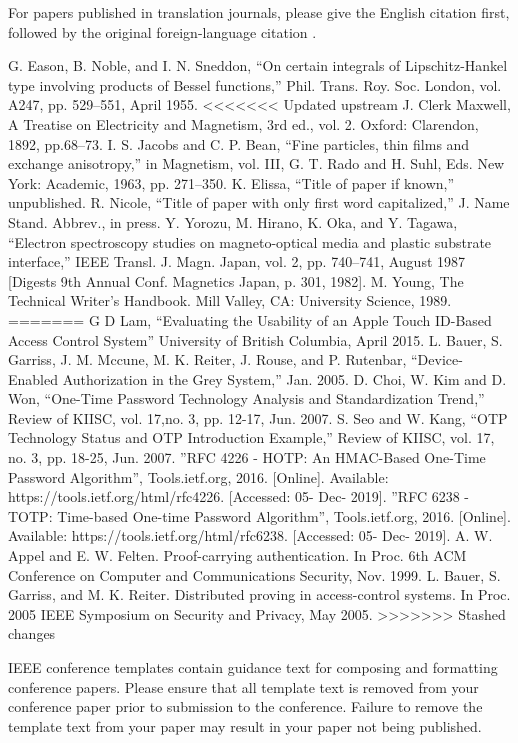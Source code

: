 \documentclass[conference]{IEEEtran}
\begin{document}
For papers published in translation journals, please give the English 
citation first, followed by the original foreign-language citation \cite{b6}.

\begin{thebibliography}{00}
 G. Eason, B. Noble, and I. N. Sneddon, ``On certain integrals of Lipschitz-Hankel type involving products of Bessel functions,'' Phil. Trans. Roy. Soc. London, vol. A247, pp. 529--551, April 1955.
<<<<<<< Updated upstream
 J. Clerk Maxwell, A Treatise on Electricity and Magnetism, 3rd ed., vol. 2. Oxford: Clarendon, 1892, pp.68--73.
 I. S. Jacobs and C. P. Bean, ``Fine particles, thin films and exchange anisotropy,'' in Magnetism, vol. III, G. T. Rado and H. Suhl, Eds. New York: Academic, 1963, pp. 271--350.
 K. Elissa, ``Title of paper if known,'' unpublished.
 R. Nicole, ``Title of paper with only first word capitalized,'' J. Name Stand. Abbrev., in press.
 Y. Yorozu, M. Hirano, K. Oka, and Y. Tagawa, ``Electron spectroscopy studies on magneto-optical media and plastic substrate interface,'' IEEE Transl. J. Magn. Japan, vol. 2, pp. 740--741, August 1987 [Digests 9th Annual Conf. Magnetics Japan, p. 301, 1982].
 M. Young, The Technical Writer's Handbook. Mill Valley, CA: University Science, 1989.
=======
 G D Lam, “Evaluating the Usability of an Apple Touch ID-Based Access Control System” University of British Columbia, April 2015.
 L. Bauer, S. Garriss, J. M. Mccune, M. K. Reiter, J. Rouse, and P. Rutenbar, “Device-Enabled Authorization in the Grey System,” Jan. 2005.
 D. Choi, W. Kim and D. Won, “One-Time Password Technology Analysis and Standardization Trend,” Review of KIISC, vol. 17,no. 3, pp. 12-17, Jun. 2007.
 S. Seo and W. Kang, “OTP Technology Status and OTP Introduction Example,” Review of KIISC, vol. 17, no. 3, pp. 18-25, Jun. 2007.
 ”RFC 4226 - HOTP: An HMAC-Based One-Time Password Algorithm”, Tools.ietf.org, 2016. [Online]. Available: https://tools.ietf.org/html/rfc4226. [Accessed: 05- Dec- 2019].
 ”RFC 6238 - TOTP: Time-based One-time Password Algorithm”, Tools.ietf.org, 2016. [Online]. Available: https://tools.ietf.org/html/rfc6238. [Accessed: 05- Dec- 2019].
 A. W. Appel and E. W. Felten. Proof-carrying authentication. In Proc. 6th ACM Conference on Computer and Communications Security, Nov. 1999.
 L. Bauer, S. Garriss, and M. K. Reiter. Distributed proving in access-control systems. In Proc. 2005 IEEE Symposium on Security and Privacy, May 2005.
>>>>>>> Stashed changes
\end{thebibliography}
\vspace{12pt}
\color{red}
IEEE conference templates contain guidance text for composing and formatting conference papers. Please ensure that all template text is removed from your conference paper prior to submission to the conference. Failure to remove the template text from your paper may result in your paper not being published.
\end{document}
